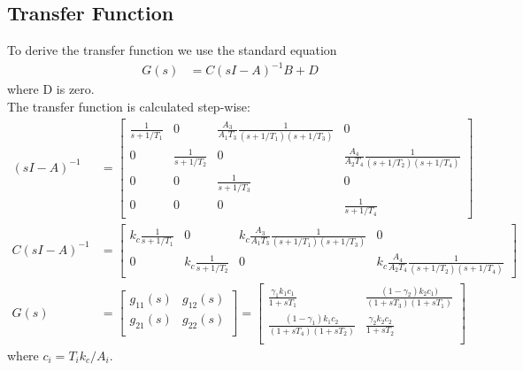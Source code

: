 \documentclass[a4paper,12pt,oneside,onecolumn]{article}
\begin{document}
\subsection{Transfer Function}
To derive the transfer function we use the standard equation
\begin{align}
    G(s) &= C(sI-A)^{-1}B+D
\end{align}
where D is zero.\\
The transfer function is calculated step-wise:
\begin{align}
    (sI-A)^{-1} &= \begin{bmatrix}
    \frac{1}{s + 1/T_1} & 0 & \frac{A_3}{A_1 T_3} \frac{1}{(s+1/T_1)(s+1/T_3)} & 0\\
    0 & \frac{1}{s + 1/T_2} & 0 & \frac{A_4}{A_2 T_4} \frac{1}{(s+1/T_2)(s+1/T_4)}\\
    0 & 0 & \frac{1}{s+1/T_3} & 0\\
    0 & 0 & 0 & \frac{1}{s+1/T_4}
    \end{bmatrix}\\[1em]
    C(sI-A)^{-1} &= \begin{bmatrix}
        k_c \frac{1}{s + 1/T_1} & 0 & k_c\frac{A_3}{A_1 T_3} \frac{1}{(s+1/T_1)(s+1/T_3)} & 0 \\
        0 & k_c \frac{1}{s + 1/T_2} & 0 & k_c\frac{A_4}{A_2 T_4} \frac{1}{(s+1/T_2)(s+1/T_4)}
    \end{bmatrix}\\[1em]
    G(s) &= \begin{bmatrix}
        g_{11}(s) & g_{12}(s) \\
        g_{21}(s) & g_{22}(s) \\
        \end{bmatrix} = 
        \begin{bmatrix}
            \frac{\gamma_1 k_1 c_1}{1+s T_1} & \frac{(1-\gamma_2) k_2 c_1)}{(1+s T_3)(1+s T_1)} \\
            \frac{(1-\gamma_1) k_1 c_2}{(1+s T_4)(1+s T_2)} & \frac{\gamma_2 k_2 c_2}{1+s T_2} \\
        \end{bmatrix}
\end{align}
where $c_i = T_i k_c / A_i$. \\
\end{document}
